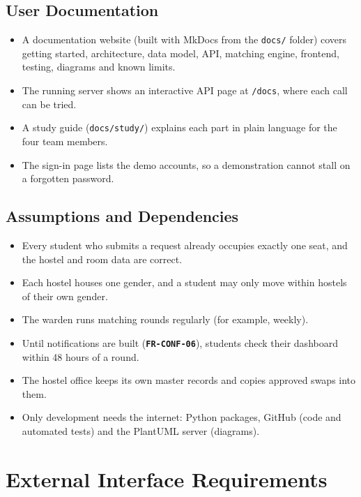\documentclass[11pt,a4paper,parskip=half,toc=listof]{scrreprt}
\newcommand{\Req}[1]{\textbf{\texttt{#1}}}
\begin{document}
\section{User Documentation}

\begin{itemize}
  \item A documentation website (built with MkDocs from the \texttt{docs/}
    folder) covers getting started, architecture, data model, API,
    matching engine, frontend, testing, diagrams and known limits.
  \item The running server shows an interactive API page at
    \texttt{/docs}, where each call can be tried.
  \item A study guide (\texttt{docs/study/}) explains each part in plain
    language for the four team members.
  \item The sign-in page lists the demo accounts, so a demonstration
    cannot stall on a forgotten password.
\end{itemize}

\section{Assumptions and Dependencies}

\begin{itemize}
  \item Every student who submits a request already occupies exactly one
    seat, and the hostel and room data are correct.
  \item Each hostel houses one gender, and a student may only move within
    hostels of their own gender.
  \item The warden runs matching rounds regularly (for example, weekly).
  \item Until notifications are built (\Req{FR-CONF-06}), students check
    their dashboard within 48 hours of a round.
  \item The hostel office keeps its own master records and copies approved
    swaps into them.
  \item Only development needs the internet: Python packages, GitHub (code
    and automated tests) and the PlantUML server (diagrams).
\end{itemize}

\chapter{External Interface Requirements}
\end{document}
